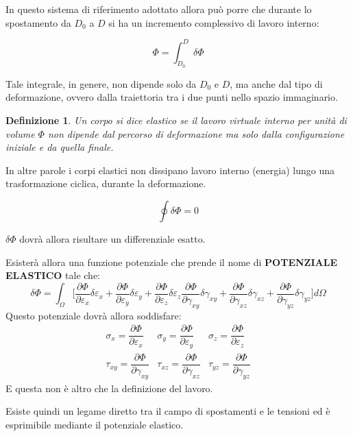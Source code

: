 \documentclass{article}
\newtheorem*{definition}{Definizione}
\begin{document}
\begin{adjustwidth}{2in}{}
	In questo sistema di riferimento adottato allora può porre che durante lo spostamento da $D_0$ a $D$ si ha un incremento complessivo di lavoro interno:
	
	\[
	\Phi = \int_{D_0}^{D} \delta \Phi
	\]
	
	Tale integrale, in genere, non dipende solo da $ D_0 $ e $ D $, ma anche dal tipo di deformazione,
	ovvero dalla traiettoria tra i due punti nello spazio immaginario. \newline
	
	
	\begin{definition}
			Un corpo si dice elastico se il lavoro virtuale interno per unità di volume $ \Phi $ non dipende dal percorso di deformazione ma solo dalla configurazione iniziale e da quella finale. \newline
	\end{definition} 

	In altre parole i corpi elastici non dissipano lavoro interno (energia) lungo una trasformazione
	ciclica, durante la deformazione.
	
	\[
	 \oint \delta \Phi = 0
	\]
	
	$ \delta \Phi $ dovrà allora risultare un differenziale esatto. 
	
	Esisterà allora una funzione potenziale che
	prende il nome di \textbf{POTENZIALE ELASTICO} tale che:
	\[
	\delta \Phi = \int_{\Omega}  \Bigg[  \frac{\partial \Phi}{\partial \varepsilon_x} \delta\varepsilon_x + \frac{\partial \Phi}{\partial \varepsilon_y} \delta\varepsilon_y + \frac{\partial \Phi}{\partial \varepsilon_z} \delta\varepsilon_z 
	\frac{\partial \Phi}{\partial \gamma_{xy}} \delta\gamma_{xy} + \frac{\partial \Phi}{\partial \gamma_{xz}} \delta\gamma_{xz} + \frac{\partial \Phi}{\partial \gamma_{yz}} \delta\gamma_{yz} \Bigg] d\Omega
	\]
	Questo potenziale dovrà allora soddisfare:
	\[
	\begin{matrix}			
			\sigma_x = \dfrac{\partial \Phi}{\partial \varepsilon_x} 	& \sigma_y = \dfrac{\partial \Phi}{\partial \varepsilon_y} & \sigma_z = \dfrac{\partial \Phi}{\partial \varepsilon_z} \\
		\tau_{xy} = \dfrac{\partial \Phi}{\partial \gamma_{xy}}	& \tau_{xz} = \dfrac{\partial \Phi}{\partial \gamma_{xz}}  & \tau_{yz} = \dfrac{\partial \Phi}{\partial \gamma_{yz}} 	
	\end{matrix}
	\]
	E questa non è altro che la definizione del lavoro. \newline 
	
	Esiste quindi un legame diretto tra il campo di spostamenti e le tensioni ed è esprimibile mediante il potenziale elastico. \newline
	

\end{adjustwidth}
\end{document}

